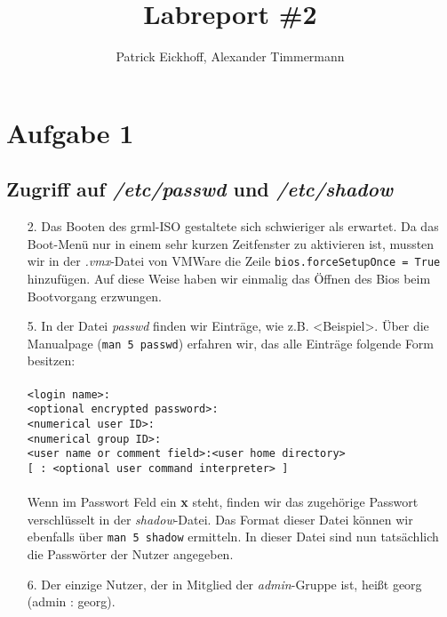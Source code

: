 \documentclass{scrartcl}
\author{Patrick Eickhoff, Alexander Timmermann}
\title{Labreport \#2}
\date{}
\begin{document}
    \maketitle
    \section*{Aufgabe 1}
    \label{sec:Aufgabe 1}

      \subsection{Zugriff auf \textit{/etc/passwd} und \textit{/etc/shadow}}
      \label{sub:Zugriff auf /etc/passwd und /etc/shadow}

      \begin{enumerate}
        \item[2.] Das Booten des grml-ISO gestaltete sich schwieriger als
                  erwartet. Da das Boot-Menü nur in einem sehr kurzen
                  Zeitfenster zu aktivieren ist, mussten wir in der
                  \textit{.vmx}-Datei von VMWare die Zeile
                  \texttt{bios.forceSetupOnce = True} hinzufügen.
                  Auf diese Weise haben wir einmalig das Öffnen des Bios beim
                  Bootvorgang erzwungen.
        \item[5.] In der Datei \textit{passwd} finden wir Einträge, wie z.B.
                  <Beispiel>. Über die Manualpage (\texttt{man 5 passwd})
                  erfahren wir, das alle Einträge folgende Form besitzen:\\\\
                  \texttt{<login name>:\\
                  <optional encrypted password>:\\
                  <numerical user ID>:\\
                  <numerical group ID>:\\
                  <user name or comment field>:<user home directory>\\
                  {[} : <optional user command interpreter> ] } \\\\
                  Wenn im Passwort Feld ein \textbf{x} steht, finden wir das
                  zugehörige Passwort verschlüsselt in der
                  \textit{shadow}-Datei.
                  Das Format dieser Datei können wir ebenfalls über
                  \texttt{man 5 shadow} ermitteln.  In dieser Datei sind nun
                  tatsächlich die Passwörter der Nutzer angegeben.
          \item[6.] Der einzige Nutzer, der in Mitglied der
                    \textit{admin}-Gruppe ist, heißt georg (admin : georg).
      \end{enumerate}
\end{document}
